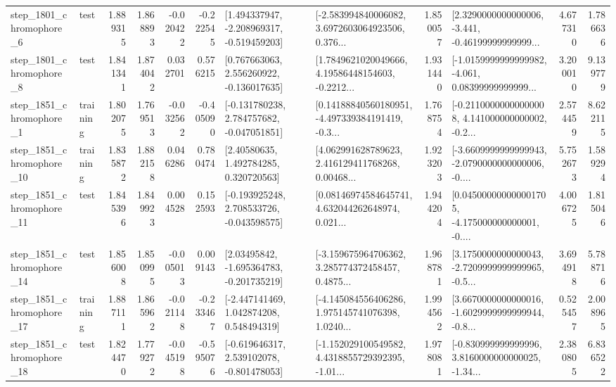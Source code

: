 \begin{tabular}{llrrrrllrlrr}
  step\_1801\_chromophore\_6 &      test &      1.889315 &    1.868893 &     -0.020422 & -0.222545 &   [1.494337947, -2.208969317, -0.519459203] &  [-2.583994840006082, 3.6972603064923506, 0.376... &       1.850057 &  [2.3290000000000006, -3.441, -0.46199999999999... &            4.677310 &          1.786636 \\
  step\_1801\_chromophore\_8 &      test &      1.841341 &    1.874042 &      0.032701 &  0.576215 &    [0.767663063, 2.556260922, -0.136017635] &  [1.7849621020049666, 4.19586448154603, -0.2212... &       1.931440 &  [-1.0159999999999982, -4.061, 0.08399999999999... &            3.200010 &          9.139779 \\
  step\_1851\_chromophore\_1 &  training &      1.802075 &    1.769513 &     -0.032562 & -0.405090 &   [-0.131780238, 2.784757682, -0.047051851] &  [0.14188840560180951, -4.497339384191419, -0.3... &       1.768754 &  [-0.21100000000000008, 4.141000000000002, -0.2... &            2.574459 &          8.622115 \\
 step\_1851\_chromophore\_10 &  training &      1.835872 &    1.882158 &      0.046286 &  0.780474 &      [2.40580635, 1.492784285, 0.320720563] &  [4.062991628789623, 2.416129411768268, 0.00468... &       1.923203 &  [-3.6609999999999943, -2.0790000000000006, -0.... &            5.752673 &          1.589294 \\
 step\_1851\_chromophore\_11 &      test &      1.845396 &    1.849923 &      0.004528 &  0.152593 &   [-0.193925248, 2.708533726, -0.043598575] &  [0.08146974584645741, 4.632044262648974, 0.021... &       1.944204 &  [0.045000000000001705, -4.175000000000001, -0.... &            4.006725 &          1.815046 \\
 step\_1851\_chromophore\_14 &      test &      1.856008 &    1.850995 &     -0.005013 &  0.009143 &    [2.03495842, -1.695364783, -0.201735219] &  [-3.159675964706362, 3.285774372458457, 0.4875... &       1.968781 &  [3.1750000000000043, -2.7209999999999965, -0.5... &            3.694918 &          5.788716 \\
 step\_1851\_chromophore\_17 &  training &      1.887111 &    1.865962 &     -0.021148 & -0.233467 &    [-2.447141469, 1.042874208, 0.548494319] &  [-4.145084556406286, 1.975145741076398, 1.0240... &       1.994562 &  [3.6670000000000016, -1.6029999999999944, -0.8... &            0.525457 &          2.008965 \\
 step\_1851\_chromophore\_18 &      test &      1.824470 &    1.779272 &     -0.045198 & -0.595076 &   [-0.619646317, 2.539102078, -0.801478053] &  [-1.152029100549582, 4.4318855729392395, -1.01... &       1.978081 &  [-0.830999999999996, 3.8160000000000025, -1.34... &            2.380805 &          6.836522 \\

\end{tabular}

